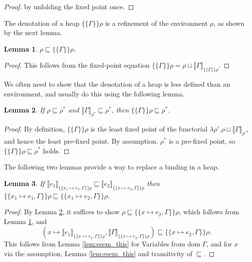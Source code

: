 \documentclass[twopage]{scrartcl}
\newtheorem{lemma}{Lemma}
\theoremstyle{nonumberbreak}
\newtheorem{proof}{Proof}
\newcommand{\dom}[1]{\text{dom}\;#1}
\newcommand{\dsem}[2]{\llbracket #1 \rrbracket_{#2}}
\newcommand{\esem}[1]{\{\!\!\!\{#1\}\!\!\!\}}
\begin{document}
\begin{proof}
by unfolding the fixed point once.
\end{proof}

The denotation of a heap $\esem\Gamma\rho$ is a refinement of the environment $\rho$, as shown by the next lemma.

\begin{lemma}
$\rho \sqsubseteq \esem{\Gamma}{\rho}$.
\label{lem:rho_below_esem}
\end{lemma}

\begin{proof}
This follows from the fixed-point equation $\esem{\Gamma}{\rho} = \rho \sqcup \dsem{\Gamma}{\esem{\Gamma}{\rho}}$.
\end{proof}

We often need to show that the denotation of a heap is less defined than an environment, and usually do this using the following lemma.
\begin{lemma}
If $\rho \sqsubseteq \rho^*$ and $\dsem{\Gamma}{\rho^*} \sqsubseteq \rho^*$, then $\esem{\Gamma}\rho \sqsubseteq \rho^*$.
\label{lem:esem_below}
\end{lemma}

\begin{proof}
By definition, $\esem{\Gamma}\rho$ is the least fixed point of the functorial $\lambda \rho'. \rho \sqcup \dsem{\Gamma}{\rho'}$, and hence the least pre-fixed point. By assumption, $\rho^*$ is a pre-fixed point, so $\esem{\Gamma}\rho \sqsubseteq \rho^*$ holds.
\end{proof}

The following two lemmas provide a way to replace a binding in a heap.
\begin{lemma}
If $\dsem{e_1}{\esem{x_1 \mapsto e_2, \Gamma}\rho} \sqsubseteq \dsem{e_2}{\esem{x \mapsto e_2, \Gamma}\rho}$
then $\esem{x_1 \mapsto e_1, \Gamma}\rho \sqsubseteq \esem{x_1 \mapsto e_2, \Gamma}\rho$.
\label{lem:esem_subst_expr_below}
\end{lemma}

\begin{proof}
By Lemma \ref{lem:esem_below}, it suffices to show $\rho \sqsubseteq \esem{x \mapsto e_2, \Gamma}\rho$, which follows from  Lemma \ref{lem:rho_below_esem}, and 
\[
(x \mapsto \dsem{e_1}{\esem{x \mapsto e_2, \Gamma}\rho}, \dsem{\Gamma}{\esem{x \mapsto e_2, \Gamma}\rho}) \sqsubseteq \esem{x \mapsto e_2, \Gamma}\rho.
\]
This follows from Lemma \ref{lem:esem_this} for Variables from $\dom\Gamma$, and for $x$ via the assumption, Lemma \ref{lem:esem_this} and transitivity of $\sqsubseteq$.
\end{proof}
\end{document}

